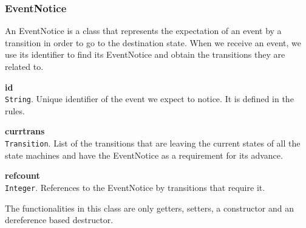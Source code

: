 \subsubsection{EventNotice}
An EventNotice is a class that represents the expectation of an event by a transition in order to go to the destination state. When we 
receive an event, we use its identifier to find its EventNotice and obtain the transitions they are related to.\\
\begin{list}{-}{The attributes are:}
  \item {\bf id}\\
    \texttt{String}. Unique identifier of the event we expect to notice. It is defined in the rules.
  \item {\bf currtrans}\\
    \texttt{Transition}. List of the transitions that are leaving the current states of all the state machines and have the EventNotice as 
    a requirement for its advance.
  \item {\bf refcount}\\
    \texttt{Integer}. References to the EventNotice by transitions that require it.
\end{list}
The functionalities in this class are only getters, setters, a constructor and an dereference based destructor. 
